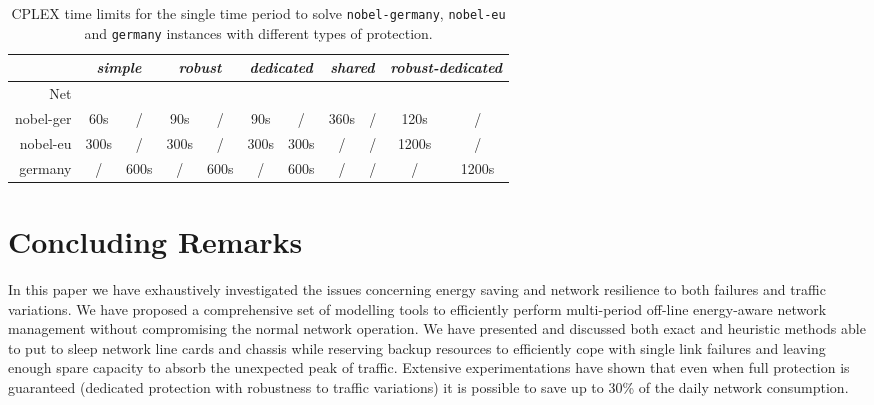 \documentclass[final,5p,times,twocolumn]{elsarticle}
\begin{document}
\begin{table*}[!ht]\footnotesize
\tabcolsep 6pt
\caption{CPLEX time limits for the single time period to solve {\tt nobel-germany}, {\tt nobel-eu} and {\tt germany} instances with different types of protection.}
\begin{center}
\begin{tabular}{rcccccccccc}
& \multicolumn{2}{c}{\textit{simple}} & \multicolumn{2}{c}{\textit{robust}} & \multicolumn{2}{c}{\textit{dedicated}} & \multicolumn{2}{c}{\textit{shared}} & \multicolumn{2}{c}{\textit{robust-dedicated}} \\
\hline
Net &  &  &  &  &  &  &  &  &  &  \\
\hline

nobel-ger	& 60s   & /    & 90s  & /    &  90s  & /    & 360s & /    & 120s  & /     \\
nobel-eu	& 300s  & /    & 300s & /    &  300s & 300s & /    & /    & 1200s & /     \\
germany  	& /     & 600s & /    & 600s &  /    & 600s & /    & /    & /     & 1200s \\
                                                                       
\hline 
\end{tabular}
\end{center}
\label{tab:time_limit}
\end{table*}



\section{Concluding Remarks}\label{sec:conclusions}
In this paper we have exhaustively investigated the issues concerning energy saving and network resilience to both failures and traffic variations. We have proposed a comprehensive set of modelling tools to efficiently perform multi-period off-line energy-aware network management without compromising the normal network operation. We have presented and discussed both exact and heuristic methods able to put to sleep network line cards and chassis while reserving backup resources to efficiently cope with single link failures and leaving enough spare capacity to absorb the unexpected peak of traffic. Extensive experimentations have shown that even when full protection is guaranteed (dedicated protection with robustness to traffic variations) it is possible to save up to 30\% of the daily network consumption.
\end{document}
